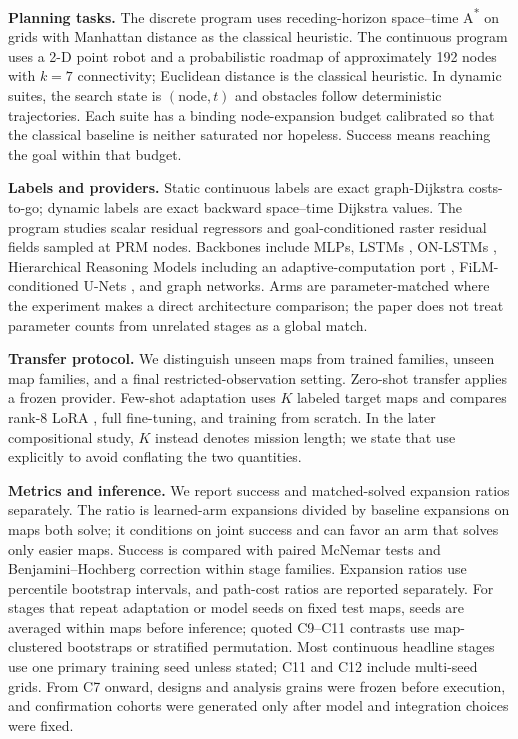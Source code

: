 \documentclass[letterpaper]{article} %
\newcommand{\stage}[1]{\textsc{#1}}
\begin{document}
\textbf{Planning tasks.} The discrete program uses receding-horizon space--time A\textsuperscript{*} on grids with Manhattan distance as the classical heuristic. The continuous program uses a 2-D point robot and a probabilistic roadmap \citep[PRM;][]{kavraki1996prm} of approximately 192 nodes with $k{=}7$ connectivity; Euclidean distance is the classical heuristic. In dynamic suites, the search state is $(\text{node},t)$ and obstacles follow deterministic trajectories. Each suite has a binding node-expansion budget calibrated so that the classical baseline is neither saturated nor hopeless. Success means reaching the goal within that budget.

\textbf{Labels and providers.} Static continuous labels are exact graph-Dijkstra costs-to-go; dynamic labels are exact backward space--time Dijkstra values. The program studies scalar residual regressors and goal-conditioned raster residual fields sampled at PRM nodes. Backbones include MLPs, LSTMs \citep{hochreiter1997lstm}, ON-LSTMs \citep{shen2019onlstm}, Hierarchical Reasoning Models \citep[HRMs;][]{wang2025hrm} including an adaptive-computation port \citep{graves2016act,banino2021pondernet}, FiLM-conditioned U-Nets \citep{ronneberger2015unet,perez2018film}, and graph networks. Arms are parameter-matched where the experiment makes a direct architecture comparison; the paper does not treat parameter counts from unrelated stages as a global match.

\textbf{Transfer protocol.} We distinguish unseen maps from trained families, unseen map families, and a final restricted-observation setting. Zero-shot transfer applies a frozen provider. Few-shot adaptation uses $K$ labeled target maps and compares rank-8 LoRA \citep{hu2021lora}, full fine-tuning, and training from scratch. In the later compositional study, $K$ instead denotes mission length; we state that use explicitly to avoid conflating the two quantities.

\textbf{Metrics and inference.} We report success and matched-solved expansion ratios separately. The ratio is learned-arm expansions divided by baseline expansions on maps both solve; it conditions on joint success and can favor an arm that solves only easier maps. Success is compared with paired McNemar tests and Benjamini--Hochberg correction within stage families. Expansion ratios use percentile bootstrap intervals, and path-cost ratios are reported separately. For stages that repeat adaptation or model seeds on fixed test maps, seeds are averaged within maps before inference; quoted \stage{C9--C11} contrasts use map-clustered bootstraps or stratified permutation. Most continuous headline stages use one primary training seed unless stated; \stage{C11} and \stage{C12} include multi-seed grids. From \stage{C7} onward, designs and analysis grains were frozen before execution, and confirmation cohorts were generated only after model and integration choices were fixed.
\end{document}
